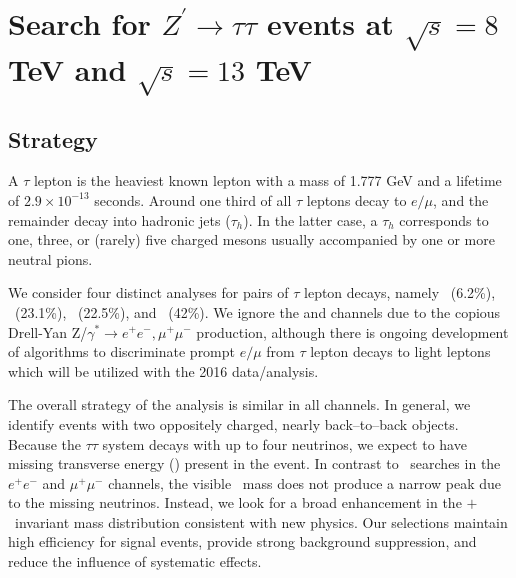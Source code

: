 \chapter{Search for $Z^{\prime}\to\tau\tau$ events at $\sqrt{s} = 8$ TeV and $\sqrt{s} = 13$ TeV}

\section{Strategy}\label{sec:strategy}
A $\tau$ lepton is the heaviest known lepton with a mass of 1.777 GeV and a lifetime of $2.9\times10^{-13}$ seconds. Around one third of
all $\tau$ leptons decay to $e/\mu$, and the remainder decay into hadronic jets ($\tau_{h}$). 
In the latter case, a $\tau_{h}$ corresponds to one, three, or (rarely) five charged mesons usually accompanied by one or
more neutral pions.

We consider four distinct analyses for pairs of $\tau$ lepton decays, namely \emu ~(6.2\%), \etau ~(23.1\%), \mutau  ~(22.5\%), and
\ditauhad ~(42\%). We ignore the \EE and \MM channels due to the copious Drell-Yan
Z/$\gamma^*\rightarrow e^+e^-, \mu^+\mu^-$ production, although there is ongoing development of algorithms to discriminate prompt $e/\mu$ from $\tau$ lepton 
decays to light leptons which will be utilized with the 2016 data/analysis.

The overall strategy of the analysis is similar in all channels. 
In general, we identify events with two oppositely charged, nearly back--to--back objects. Because the $\tau\tau$ system decays with up to four neutrinos, we expect to have missing transverse energy (\MET) present in the event. In contrast to \zprime ~searches in the $e^+e^-$ and $\mu^+\mu^-$ channels, the visible \ditau ~mass does not produce a narrow peak due to the missing neutrinos. Instead, we look for a broad enhancement in the \ditau$+$\MET ~invariant mass distribution consistent with new physics.  Our selections maintain high efficiency for signal events, provide strong background suppression, and reduce the influence of systematic effects.  

